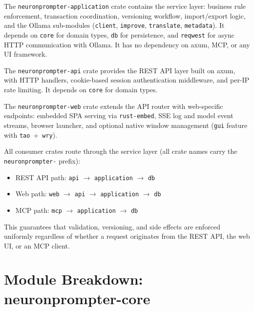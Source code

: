 \documentclass[a4paper, 11pt, oneside]{report}
\begin{document}
The \texttt{neuronprompter-application} crate contains the service layer:
business rule enforcement, transaction coordination, versioning workflow,
import/export logic, and the Ollama sub-modules (\texttt{client},
\texttt{improve}, \texttt{translate}, \texttt{metadata}).  It depends on
\texttt{core} for domain types, \texttt{db} for persistence, and
\texttt{reqwest} for async HTTP communication with Ollama.  It has no
dependency on axum, MCP, or any UI framework.

The \texttt{neuronprompter-api} crate provides the REST API layer built
on axum, with HTTP handlers, cookie-based session authentication middleware, and
per-IP rate limiting.  It depends on \texttt{core} for domain types.

The \texttt{neuronprompter-web} crate extends the API router with web-specific
endpoints: embedded SPA serving via \texttt{rust-embed}, SSE log and model
event streams, browser launcher, and optional native window management
(\texttt{gui} feature with \texttt{tao}~+~\texttt{wry}).

All consumer crates route through the service layer (all crate names
carry the \texttt{neuronprompter-} prefix):

\begin{itemize}
  \item REST API path: \texttt{api} $\to$ \texttt{application} $\to$ \texttt{db}
  \item Web path: \texttt{web} $\to$ \texttt{api} $\to$ \texttt{application} $\to$ \texttt{db}
  \item MCP path: \texttt{mcp} $\to$ \texttt{application} $\to$ \texttt{db}
\end{itemize}

This guarantees that validation, versioning, and side effects are enforced
uniformly regardless of whether a request originates from the REST API, the
web UI, or an MCP client.

\section{Module Breakdown: neuronprompter-core}
\label{sec:mod-core}
\end{document}
